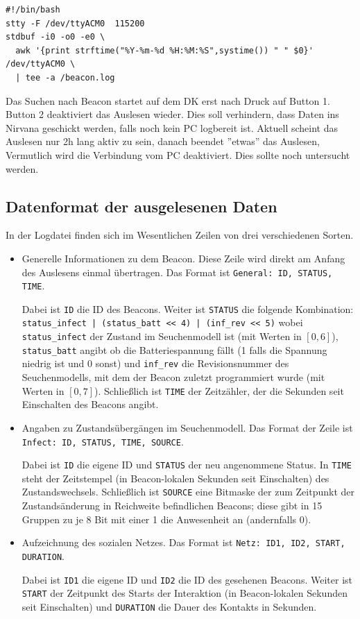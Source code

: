 \documentclass[11pt,ngerman]{scrartcl} %
\begin{document}
\begin{verbatim}
#!/bin/bash
stty -F /dev/ttyACM0  115200
stdbuf -i0 -o0 -e0 \
  awk '{print strftime("%Y-%m-%d %H:%M:%S",systime()) " " $0}' /dev/ttyACM0 \
  | tee -a /beacon.log
\end{verbatim}

Das Suchen nach Beacon startet auf dem DK erst nach Druck auf Button 1. Button 2 deaktiviert das Auslesen wieder. Dies soll verhindern, dass Daten ins Nirvana geschickt werden, falls noch kein PC logbereit ist.
Aktuell scheint das Auslesen nur 2h lang aktiv zu sein, danach beendet ''etwas'' das Auslesen, Vermutlich wird die Verbindung vom PC deaktiviert. Dies sollte noch untersucht werden.

\subsection{Datenformat der ausgelesenen Daten}

In der Logdatei finden sich im Wesentlichen Zeilen von drei verschiedenen Sorten.
\begin{itemize}
\item Generelle Informationen zu dem Beacon. Diese Zeile wird direkt am
  Anfang des Auslesens einmal übertragen. Das Format ist
  \verb!General: ID, STATUS, TIME!.

  Dabei ist \verb!ID! die ID des Beacons. Weiter ist \verb!STATUS! die
  folgende Kombination: \verb!status_infect | (status_batt << 4) | (inf_rev << 5)! 
  wobei \verb!status_infect! der Zustand im Seuchenmodell ist (mit Werten in
  $[0,6]$), \verb!status_batt! angibt ob die Batteriespannung fällt (1 falls
  die Spannung niedrig ist und 0 sonst) und \verb!inf_rev! die
  Revisionsnummer des Seuchenmodells, mit dem der Beacon zuletzt
  programmiert wurde (mit Werten in $[0,7]$). Schließlich ist \verb!TIME!
  der Zeitzähler, der die Sekunden seit Einschalten des Beacons angibt.
\item Angaben zu Zustandsübergängen im Seuchenmodell. Das Format der Zeile ist
  \verb!Infect: ID, STATUS, TIME, SOURCE!.

  Dabei ist \verb!ID! die eigene ID und \verb!STATUS! der neu angenommene
  Status. In \verb!TIME! steht der Zeitstempel (in Beacon-lokalen Sekunden
  seit Einschalten) des Zustandswechsels. Schließlich ist \verb!SOURCE! eine
  Bitmaske der zum Zeitpunkt der Zustandsänderung in Reichweite befindlichen
  Beacons; diese gibt in 15 Gruppen zu je 8 Bit mit einer 1 die Anwesenheit
  an (andernfalls 0).
\item Aufzeichnung des sozialen Netzes. Das Format ist
  \verb!Netz: ID1, ID2, START, DURATION!.

  Dabei ist \verb!ID1! die eigene ID und \verb!ID2! die ID des gesehenen
  Beacons. Weiter ist \verb!START! der Zeitpunkt des Starts der Interaktion
  (in Beacon-lokalen Sekunden seit Einschalten) und \verb!DURATION! die
  Dauer des Kontakts in Sekunden.
\end{itemize}
\end{document}
